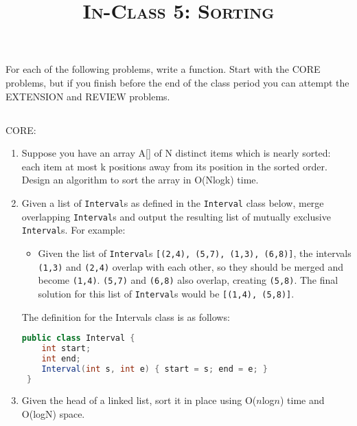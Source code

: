 \documentclass{article}
\title{\large{\textsc{In-Class 5: Sorting}}}
\date{}
\begin{document}
\maketitle

\subsection*{}

For each of the following problems, write a function. Start with the CORE problems, but if you finish before the end of the class period you can attempt the EXTENSION and REVIEW problems.

\subsection*{}

CORE:

\begin{enumerate}

\item Suppose you have an array A[] of N distinct items which is nearly sorted: each item at most k positions away from its position in the sorted order. Design an algorithm to sort the array in O(Nlogk) time.
	
\item Given a list of \texttt{Interval}s as defined in the \texttt{Interval} class below, merge overlapping \texttt{Interval}s and output the resulting list of mutually exclusive \texttt{Interval}s.  For example:

\begin{itemize}
    \item Given the list of \texttt{Interval}s \texttt{[(2,4), (5,7), (1,3), (6,8)]}, the  intervals \texttt{(1,3)} and \texttt{(2,4)} overlap with each other, so they should be merged and become \texttt{(1,4)}. \texttt{(5,7)} and \texttt{(6,8)} also overlap, creating \texttt{(5,8)}.  The final solution for this list of \texttt{Interval}s would be \texttt{[(1,4), (5,8)]}.
\end{itemize}

The definition for the Intervals class is as follows:

\begin{lstlisting}[language=Java]
 public class Interval {
    int start;
    int end;
    Interval(int s, int e) { start = s; end = e; }
 }
\end{lstlisting}
    
\item Given the head of a linked list, sort it in place using O($n$log$n$) time and O(logN) space.
    
\end{enumerate}
\end{document}

